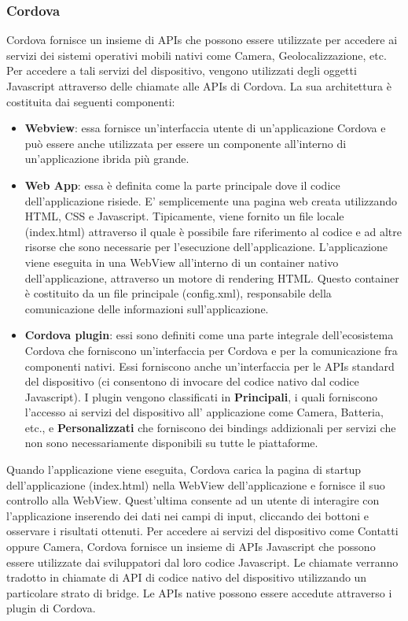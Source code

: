 \subsubsection{Cordova}
Cordova fornisce un insieme di APIs che possono essere utilizzate per accedere ai servizi dei sistemi operativi mobili nativi come Camera, Geolocalizzazione, etc. Per accedere a tali servizi del dispositivo, vengono utilizzati degli oggetti Javascript attraverso delle chiamate alle APIs di Cordova. La sua architettura è costituita dai seguenti componenti:
\begin{itemize}
\item \textbf{Webview}: essa fornisce un'interfaccia utente di un'applicazione Cordova e può essere anche utilizzata per essere un componente all'interno di un'applicazione ibrida più grande.
\item \textbf{Web App}: essa è definita come la parte principale dove il codice dell'applicazione risiede. E' semplicemente una pagina web creata utilizzando HTML, CSS e Javascript. Tipicamente, viene fornito un file locale (index.html) attraverso il quale è possibile fare riferimento al codice e ad altre risorse che sono necessarie per l'esecuzione dell'applicazione. L'applicazione viene eseguita in una WebView all'interno di un container nativo dell'applicazione, attraverso un motore di rendering HTML. Questo container è costituito da un file principale (config.xml), responsabile della comunicazione delle informazioni sull'applicazione.
\item \textbf{Cordova plugin}: essi sono definiti come una parte integrale dell'ecosistema Cordova che forniscono un'interfaccia per Cordova e per la comunicazione fra componenti nativi. Essi forniscono anche un'interfaccia per le APIs standard del dispositivo (ci consentono di invocare del codice nativo dal codice Javascript). I plugin vengono classificati in \textbf{Principali}, i quali forniscono l'accesso ai servizi del dispositivo all' applicazione come Camera, Batteria, etc., e \textbf{Personalizzati} che forniscono dei bindings addizionali per servizi che non sono necessariamente disponibili su tutte le piattaforme.
\end{itemize}
Quando l'applicazione viene eseguita, Cordova carica la pagina di startup dell'applicazione (index.html) nella WebView dell'applicazione e fornisce il suo controllo alla WebView. Quest'ultima consente ad un utente di interagire con l'applicazione inserendo dei dati nei campi di input, cliccando dei bottoni e osservare i risultati ottenuti. Per accedere ai servizi del dispositivo come Contatti oppure Camera, Cordova fornisce un insieme di APIs Javascript che possono essere utilizzate dai sviluppatori dal loro codice Javascript. Le chiamate verranno tradotto in chiamate di API di codice nativo del dispositivo utilizzando un particolare strato di bridge. Le APIs native possono essere accedute attraverso i plugin di Cordova.
